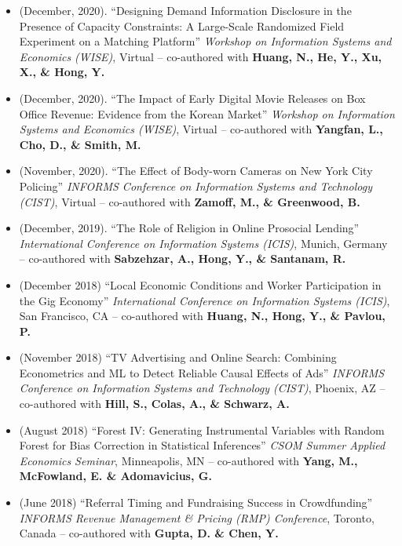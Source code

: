\documentclass[10.5pt,letterpaper,sans]{moderncv}        %
\begin{document}
\begin{itemize}
\item (December, 2020). ``Designing Demand Information Disclosure in the Presence of Capacity Constraints: A Large-Scale Randomized Field Experiment on a Matching Platform'' \textit{Workshop on Information Systems and Economics (WISE)}, Virtual -- co-authored with \textbf{Huang, N., He, Y., Xu, X., \& Hong, Y.} 

\item (December, 2020). ``The Impact of Early Digital Movie Releases on Box Office Revenue: Evidence from the Korean Market'' \textit{Workshop on Information Systems and Economics (WISE)}, Virtual -- co-authored with \textbf{Yangfan, L., Cho, D., \& Smith, M.} 

\item (November, 2020). ``The Effect of Body-worn Cameras on New York City Policing'' \textit{INFORMS Conference on Information Systems and Technology (CIST)}, Virtual -- co-authored with \textbf{Zamoff, M., \& Greenwood, B.} 

\item (December, 2019). ``The Role of Religion in Online Prosocial Lending'' \textit{International Conference on Information Systems (ICIS)}, Munich, Germany -- co-authored with \textbf{Sabzehzar, A., Hong, Y., \& Santanam, R.} 

\item (December 2018) ``Local Economic Conditions and Worker Participation in the Gig Economy'' \textit{International Conference on Information Systems (ICIS)}, San Francisco, CA -- co-authored with \textbf{Huang, N., Hong, Y., \& Pavlou, P.} 

\item (November 2018) ``TV Advertising and Online Search: Combining Econometrics and ML to Detect Reliable Causal Effects of Ads'' \textit{INFORMS Conference on Information Systems and Technology (CIST)}, Phoenix, AZ -- co-authored with \textbf{Hill, S., Colas, A., \& Schwarz, A.}

\item (August 2018) ``Forest IV: Generating Instrumental Variables with Random Forest for Bias Correction in Statistical Inferences'' \textit{CSOM Summer Applied Economics Seminar}, Minneapolis, MN -- co-authored with \textbf{Yang, M., McFowland, E. \& Adomavicius, G.}

\item (June 2018) ``Referral Timing and Fundraising Success in Crowdfunding'' \textit{INFORMS Revenue Management \& Pricing (RMP) Conference}, Toronto, Canada -- co-authored with \textbf{Gupta, D. \& Chen, Y.}


\end{itemize}
\end{document}
